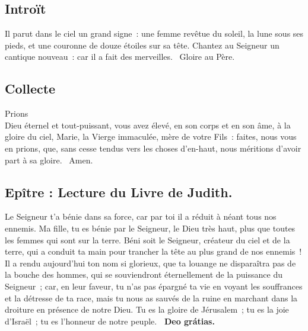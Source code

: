 


\begin{multicols}{2}
\subsection*{Introït}
Il parut dans le ciel un grand signe : une femme revêtue du soleil, la lune sous ses pieds, et une couronne de douze étoiles sur sa tête.
Chantez au Seigneur un cantique nouveau : car il a fait des merveilles.
\vb\ Gloire au Père.

\subsection*{Collecte}
Prions\\
Dieu éternel et tout-puissant, vous avez élevé, en son corps et en son âme, à la gloire du ciel, Marie, la Vierge immaculée, mère de votre Fils : faites, nous vous en prions, que, sans cesse tendus vers les choses d’en-haut, nous méritions d’avoir part à sa gloire.
{\textbf \rb\ Amen.}

\subsection*{Epître : Lecture du Livre de Judith.}
Le Seigneur t’a bénie dans sa force, car par toi il a réduit à néant tous nos ennemis. Ma fille, tu es bénie par le Seigneur, le Dieu très haut, plus que toutes les femmes qui sont sur la terre. Béni soit le Seigneur, créateur du ciel et de la terre, qui a conduit ta main pour trancher la tête au plus grand de nos ennemis ! Il a rendu aujourd’hui ton nom si glorieux, que ta louange ne disparaîtra pas de la bouche des hommes, qui se souviendront éternellement de la puissance du Seigneur ; car, en leur faveur, tu n’as pas épargné ta vie en voyant les souffrances et la détresse de ta race, mais tu nous as sauvés de la ruine en marchant dans la droiture en présence de notre Dieu. Tu es la gloire de Jérusalem ; tu es la joie d’Israël ; tu es l’honneur de notre peuple.
\textbf{\rb\ Deo grátias.}


\end{multicols}

